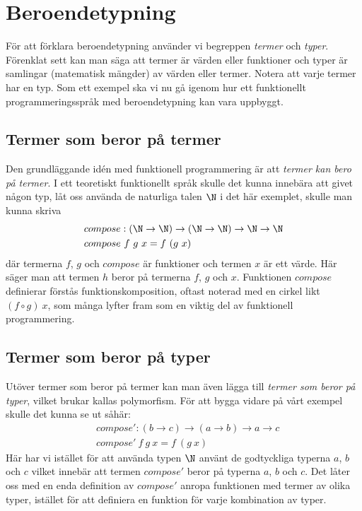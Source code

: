 \section{Beroendetypning}
För att förklara beroendetypning använder vi begreppen \emph{termer} och
\emph{typer}. Förenklat sett kan man säga att termer är värden eller funktioner
och typer är samlingar (matematisk mängder) av värden eller termer. Notera att
varje termer har en typ. Som ett exempel ska vi nu gå igenom hur ett
funktionellt programmeringsspråk med beroendetypning kan vara uppbyggt.

\subsection{Termer som beror på termer}
Den grundläggande idén med funktionell programmering är att \emph{termer kan
bero på termer}. I ett teoretiskt funktionellt språk skulle det kunna innebära
att givet någon typ, låt oss använda de naturliga talen $\N$ i det här
exemplet, skulle man kunna skriva
\begin{align*}
  &compose : (\N \to \N) \to (\N \to \N) \to \N \to \N \\
  &compose\ f\ g\ x = f\ (g\ x)
\end{align*}
där termerna $f$, $g$ och $compose$ är funktioner och termen $x$ är ett värde. Här
säger man att termen $h$ beror på termerna $f$, $g$ och $x$. Funktionen
$compose$ definierar förstås funktionskomposition, oftast noterad med en cirkel
likt $(f \circ g)\ x$, som många lyfter fram som en viktig del av funktionell
programmering.


\subsection{Termer som beror på typer}
Utöver termer som beror på termer kan man även lägga till \emph{termer som
beror på typer}, vilket brukar kallas polymorfism. För att bygga vidare på vårt
exempel skulle det kunna se ut såhär:
\begin{align*}
  &compose' : (b \to c) \to (a \to b) \to a \to c \\
  &compose'\ f\ g\ x = f\ (g\ x)
\end{align*}
Här har vi istället för att använda typen $\N$ använt de godtyckliga
typerna $a$, $b$ och $c$ vilket innebär att termen $compose'$ beror på typerna
$a$, $b$ och $c$. Det låter oss med en enda definition av $compose'$ anropa
funktionen med termer av olika typer, istället för att definiera en funktion
för varje kombination av typer.

